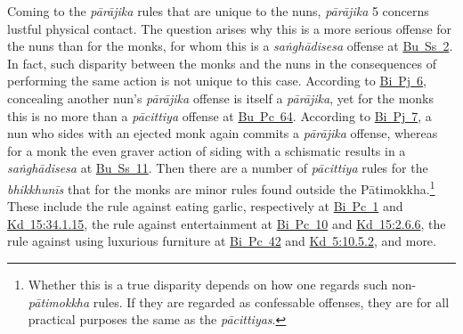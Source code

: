 \documentclass[12pt,openany]{book}%
\begin{document}
Coming to the \textit{\textsanskrit{pārājika}} rules that are unique to the nuns, \textit{\textsanskrit{pārājika}} 5 concerns lustful physical contact. The question arises why this is a more serious offense for the nuns than for the monks, for whom this is a \textit{\textsanskrit{saṅghādisesa}} offense at \href{https://suttacentral.net/pli-tv-bu-vb-ss2/en/brahmali\#1.2.15.1}{Bu~Ss~2}. In fact, such disparity between the monks and the nuns in the consequences of performing the same action is not unique to this case. According to \href{https://suttacentral.net/pli-tv-bi-vb-pj6/en/brahmali\#1.23.1}{Bi~Pj~6}, concealing another nun’s \textit{\textsanskrit{pārājika}} offense is itself a \textit{\textsanskrit{pārājika}}, yet for the monks this is no more than a \textit{\textsanskrit{pācittiya}} offense at \href{https://suttacentral.net/pli-tv-bu-vb-pc64/en/brahmali\#1.23.1}{Bu~Pc~64}. According to \href{https://suttacentral.net/pli-tv-bi-vb-pj7/en/brahmali\#1.11.1}{Bi~Pj~7}, a nun who sides with an ejected monk again commits a \textit{\textsanskrit{pārājika}} offense, whereas for a monk the even graver action of siding with a schismatic results in a \textit{\textsanskrit{saṅghādisesa}} at \href{https://suttacentral.net/pli-tv-bu-vb-ss11/en/brahmali\#1.19.1}{Bu~Ss~11}. Then there are a number of \textit{\textsanskrit{pācittiya}} rules for the \textit{\textsanskrit{bhikkhunīs}} that for the monks are minor rules found outside the \textsanskrit{Pātimokkha}.\footnote{Whether this is a true disparity depends on how one regards such non-\textit{\textsanskrit{pātimokkha}} rules. If they are regarded as confessable offenses, they are for all practical purposes the same as the \textit{\textsanskrit{pācittiyas}}. } These include the rule against eating garlic, respectively at \href{https://suttacentral.net/pli-tv-bi-vb-pc1/en/brahmali\#1.41.1}{Bi~Pc~1} and \href{https://suttacentral.net/pli-tv-kd15/en/brahmali\#34.1.15}{Kd~15:34.1.15}, the rule against entertainment at \href{https://suttacentral.net/pli-tv-bi-vb-pc10/en/brahmali\#1.15.1}{Bi~Pc~10} and \href{https://suttacentral.net/pli-tv-kd15/en/brahmali\#2.6.6}{Kd~15:2.6.6}, the rule against using luxurious furniture at \href{https://suttacentral.net/pli-tv-bi-vb-pc42/en/brahmali\#1.14.1}{Bi~Pc~42} and \href{https://suttacentral.net/pli-tv-kd5/en/brahmali\#10.5.2}{Kd~5:10.5.2}, and more.
\end{document}
